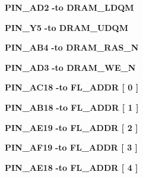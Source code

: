 \begin{DoxyCompactItemize}
\item 
{\bf P\+I\+N\+\_\+\+A\+D2} {\bfseries \textcolor{vhdlchar}{-\/}\textcolor{keywordflow}{to}\textcolor{vhdlchar}{ }\textcolor{vhdlchar}{D\+R\+A\+M\+\_\+\+L\+D\+QM}\textcolor{vhdlchar}{ }} 
\item 
{\bf P\+I\+N\+\_\+\+Y5} {\bfseries \textcolor{vhdlchar}{-\/}\textcolor{keywordflow}{to}\textcolor{vhdlchar}{ }\textcolor{vhdlchar}{D\+R\+A\+M\+\_\+\+U\+D\+QM}\textcolor{vhdlchar}{ }} 
\item 
{\bf P\+I\+N\+\_\+\+A\+B4} {\bfseries \textcolor{vhdlchar}{-\/}\textcolor{keywordflow}{to}\textcolor{vhdlchar}{ }\textcolor{vhdlchar}{D\+R\+A\+M\+\_\+\+R\+A\+S\+\_\+N}\textcolor{vhdlchar}{ }} 
\item 
{\bf P\+I\+N\+\_\+\+A\+D3} {\bfseries \textcolor{vhdlchar}{-\/}\textcolor{keywordflow}{to}\textcolor{vhdlchar}{ }\textcolor{vhdlchar}{D\+R\+A\+M\+\_\+\+W\+E\+\_\+N}\textcolor{vhdlchar}{ }} 
\item 
{\bf P\+I\+N\+\_\+\+A\+C18} {\bfseries \textcolor{vhdlchar}{-\/}\textcolor{keywordflow}{to}\textcolor{vhdlchar}{ }\textcolor{vhdlchar}{F\+L\+\_\+\+A\+D\+DR}\textcolor{vhdlchar}{ }\textcolor{vhdlchar}{[}\textcolor{vhdlchar}{ } \textcolor{vhdldigit}{0} \textcolor{vhdlchar}{ }\textcolor{vhdlchar}{]}\textcolor{vhdlchar}{ }} 
\item 
{\bf P\+I\+N\+\_\+\+A\+B18} {\bfseries \textcolor{vhdlchar}{-\/}\textcolor{keywordflow}{to}\textcolor{vhdlchar}{ }\textcolor{vhdlchar}{F\+L\+\_\+\+A\+D\+DR}\textcolor{vhdlchar}{ }\textcolor{vhdlchar}{[}\textcolor{vhdlchar}{ } \textcolor{vhdldigit}{1} \textcolor{vhdlchar}{ }\textcolor{vhdlchar}{]}\textcolor{vhdlchar}{ }} 
\item 
{\bf P\+I\+N\+\_\+\+A\+E19} {\bfseries \textcolor{vhdlchar}{-\/}\textcolor{keywordflow}{to}\textcolor{vhdlchar}{ }\textcolor{vhdlchar}{F\+L\+\_\+\+A\+D\+DR}\textcolor{vhdlchar}{ }\textcolor{vhdlchar}{[}\textcolor{vhdlchar}{ } \textcolor{vhdldigit}{2} \textcolor{vhdlchar}{ }\textcolor{vhdlchar}{]}\textcolor{vhdlchar}{ }} 
\item 
{\bf P\+I\+N\+\_\+\+A\+F19} {\bfseries \textcolor{vhdlchar}{-\/}\textcolor{keywordflow}{to}\textcolor{vhdlchar}{ }\textcolor{vhdlchar}{F\+L\+\_\+\+A\+D\+DR}\textcolor{vhdlchar}{ }\textcolor{vhdlchar}{[}\textcolor{vhdlchar}{ } \textcolor{vhdldigit}{3} \textcolor{vhdlchar}{ }\textcolor{vhdlchar}{]}\textcolor{vhdlchar}{ }} 
\item 
{\bf P\+I\+N\+\_\+\+A\+E18} {\bfseries \textcolor{vhdlchar}{-\/}\textcolor{keywordflow}{to}\textcolor{vhdlchar}{ }\textcolor{vhdlchar}{F\+L\+\_\+\+A\+D\+DR}\textcolor{vhdlchar}{ }\textcolor{vhdlchar}{[}\textcolor{vhdlchar}{ } \textcolor{vhdldigit}{4} \textcolor{vhdlchar}{ }\textcolor{vhdlchar}{]}\textcolor{vhdlchar}{ }} 

\end{DoxyCompactItemize}
